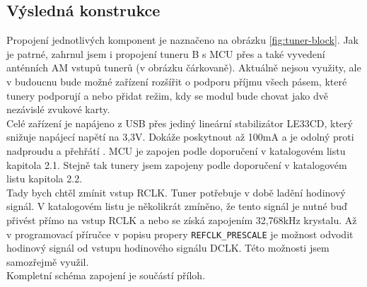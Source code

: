 \subsection{Výsledná konstrukce}

Propojení jednotlivých komponent je naznačeno na obrázku \ref{fig:tuner-block}. Jak je patrné, zahrnul jsem i propojení tuneru B s MCU přes \iis a také vyvedení anténních AM vstupů tunerů (v obrázku čárkovaně). Aktuálně nejsou využity, ale v budoucnu bude možné zařízení rozšířit o podporu příjmu všech pásem, které tunery podporují a nebo přidat režim, kdy se modul bude chovat jako dvě nezávislé zvukové karty.\\
Celé zařízení je napájeno z USB přes jediný lineární stabilizátor LE33CD, který snižuje napájecí napětí na 3,3V. Dokáže poskytnout až 100mA a je odolný proti nadproudu a přehřátí \cite{le}. MCU je zapojen podle doporučení v katalogovém listu \cite{pic} kapitola 2.1. Stejně tak tunery jsem zapojeny podle doporučení v katalogovém listu \cite{tuner-datasheet} kapitola 2.2.\\
 Tady bych chtěl zmínit vstup RCLK. Tuner potřebuje v době ladění hodinový signál. V katalogovém listu je několikrát zmíněno, že tento signál je nutné buď přivést přímo na vstup RCLK a nebo se získá zapojením 32,768kHz krystalu. Až v programovací příručce \cite{tuner-programing} v popisu propery \verb|REFCLK_PRESCALE| je možnost odvodit hodinový signál od vstupu hodinového signálu \iis DCLK. Této možnosti jsem samozřejmě využil. \\
Kompletní schéma zapojení je součástí příloh.
